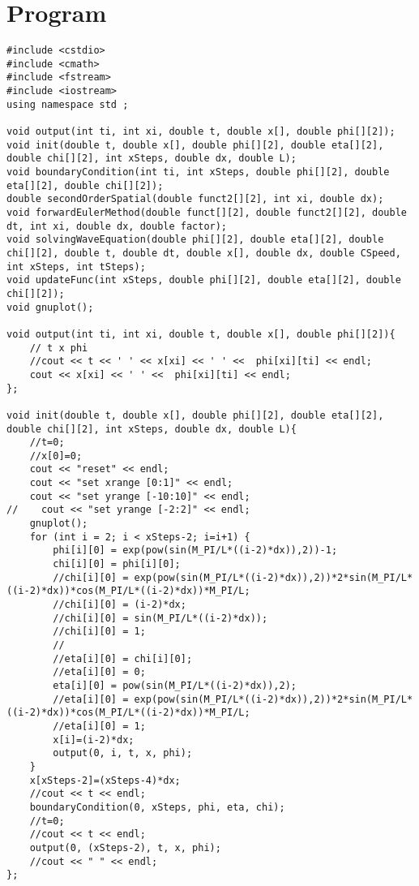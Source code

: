 \documentclass[10pt,fleqn,reqno,a4paper]{article}
\begin{document}
\section{Program}
\begin{verbatim}
#include <cstdio>
#include <cmath>
#include <fstream>
#include <iostream>
using namespace std ;

void output(int ti, int xi, double t, double x[], double phi[][2]);
void init(double t, double x[], double phi[][2], double eta[][2], double chi[][2], int xSteps, double dx, double L);
void boundaryCondition(int ti, int xSteps, double phi[][2], double eta[][2], double chi[][2]);
double secondOrderSpatial(double funct2[][2], int xi, double dx);
void forwardEulerMethod(double funct[][2], double funct2[][2], double dt, int xi, double dx, double factor);
void solvingWaveEquation(double phi[][2], double eta[][2], double chi[][2], double t, double dt, double x[], double dx, double CSpeed, int xSteps, int tSteps);
void updateFunc(int xSteps, double phi[][2], double eta[][2], double chi[][2]);
void gnuplot();

void output(int ti, int xi, double t, double x[], double phi[][2]){
    // t x phi
    //cout << t << ' ' << x[xi] << ' ' <<  phi[xi][ti] << endl;
    cout << x[xi] << ' ' <<  phi[xi][ti] << endl;
};

void init(double t, double x[], double phi[][2], double eta[][2], double chi[][2], int xSteps, double dx, double L){
    //t=0;
    //x[0]=0;
    cout << "reset" << endl;
    cout << "set xrange [0:1]" << endl;
    cout << "set yrange [-10:10]" << endl;
//    cout << "set yrange [-2:2]" << endl;
    gnuplot();
    for (int i = 2; i < xSteps-2; i=i+1) {
        phi[i][0] = exp(pow(sin(M_PI/L*((i-2)*dx)),2))-1;
        chi[i][0] = phi[i][0];
        //chi[i][0] = exp(pow(sin(M_PI/L*((i-2)*dx)),2))*2*sin(M_PI/L*((i-2)*dx))*cos(M_PI/L*((i-2)*dx))*M_PI/L;
        //chi[i][0] = (i-2)*dx;
        //chi[i][0] = sin(M_PI/L*((i-2)*dx));
        //chi[i][0] = 1;
        //
        //eta[i][0] = chi[i][0];
        //eta[i][0] = 0;
        eta[i][0] = pow(sin(M_PI/L*((i-2)*dx)),2);
        //eta[i][0] = exp(pow(sin(M_PI/L*((i-2)*dx)),2))*2*sin(M_PI/L*((i-2)*dx))*cos(M_PI/L*((i-2)*dx))*M_PI/L;
        //eta[i][0] = 1;
        x[i]=(i-2)*dx;
        output(0, i, t, x, phi);
	}
	x[xSteps-2]=(xSteps-4)*dx;
    //cout << t << endl;
    boundaryCondition(0, xSteps, phi, eta, chi);
    //t=0;
    //cout << t << endl;
    output(0, (xSteps-2), t, x, phi);
    //cout << " " << endl;
};


\end{verbatim}
\end{document}
